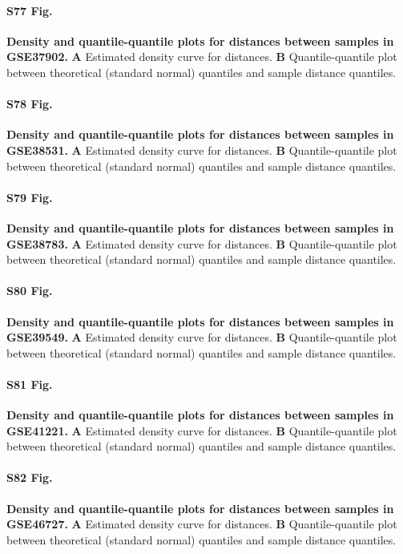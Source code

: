 \documentclass[10pt,letterpaper]{article}
\begin{document}
\paragraph*{S77 Fig.}
\hypertarget{S77_Fig}{
{\bf Density and quantile-quantile plots for distances between samples in GSE37902.} \textbf{A} Estimated density curve for distances. \textbf{B} Quantile-quantile plot between theoretical (standard normal) quantiles and sample distance quantiles.}

\paragraph*{S78 Fig.}
\hypertarget{S78_Fig}{
{\bf Density and quantile-quantile plots for distances between samples in GSE38531.} \textbf{A} Estimated density curve for distances. \textbf{B} Quantile-quantile plot between theoretical (standard normal) quantiles and sample distance quantiles.}

\paragraph*{S79 Fig.}
\hypertarget{S79_Fig}{
{\bf Density and quantile-quantile plots for distances between samples in GSE38783.} \textbf{A} Estimated density curve for distances. \textbf{B} Quantile-quantile plot between theoretical (standard normal) quantiles and sample distance quantiles.}

\paragraph*{S80 Fig.}
\hypertarget{S80_Fig}{
{\bf Density and quantile-quantile plots for distances between samples in GSE39549.} \textbf{A} Estimated density curve for distances. \textbf{B} Quantile-quantile plot between theoretical (standard normal) quantiles and sample distance quantiles.}

\paragraph*{S81 Fig.}
\hypertarget{S81_Fig}{
{\bf Density and quantile-quantile plots for distances between samples in GSE41221.} \textbf{A} Estimated density curve for distances. \textbf{B} Quantile-quantile plot between theoretical (standard normal) quantiles and sample distance quantiles.}

\paragraph*{S82 Fig.}
\hypertarget{S82_Fig}{
{\bf Density and quantile-quantile plots for distances between samples in GSE46727.} \textbf{A} Estimated density curve for distances. \textbf{B} Quantile-quantile plot between theoretical (standard normal) quantiles and sample distance quantiles.}
\end{document}
